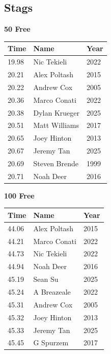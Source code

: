 \subsection{Stags}
\vspace{1.2em}
\noindent\begin{minipage}[t]{0.48\textwidth}
\centering
\textbf{\textcolor{teamprimary}{50 Free}}\par
\vspace{0.5em}
\centering
\small
\renewcommand{\arraystretch}{1.0}
\setlength{\tabcolsep}{4pt}
\begin{tabular}{@{}p{1.8cm}p{3.0cm}p{1.0cm}@{}}
\toprule
\textbf{Time} & \textbf{Name} & \textbf{Year} \\
\midrule
19.98 & Nic Tekieli & 2022 \\
20.21 & Alex Poltash & 2015 \\
20.22 & Andrew Cox & 2005 \\
20.36 & Marco Conati & 2022 \\
20.38 & Dylan Krueger & 2025 \\
20.51 & Matt Williams & 2017 \\
20.65 & Joey Hinton & 2013 \\
20.67 & Jeremy Tan & 2025 \\
20.69 & Steven Brende & 1999 \\
20.71 & Noah Deer & 2016 \\
\bottomrule
\end{tabular}
\end{minipage}
\hfill
\begin{minipage}[t]{0.48\textwidth}
\centering
\textbf{\textcolor{teamprimary}{100 Free}}\par
\vspace{0.5em}
\centering
\small
\renewcommand{\arraystretch}{1.0}
\setlength{\tabcolsep}{4pt}
\begin{tabular}{@{}p{1.8cm}p{3.0cm}p{1.0cm}@{}}
\toprule
\textbf{Time} & \textbf{Name} & \textbf{Year} \\
\midrule
44.06 & Alex Poltash & 2015 \\
44.21 & Marco Conati & 2022 \\
44.73 & Nic Tekieli & 2022 \\
44.94 & Noah Deer & 2016 \\
45.19 & Sean Su & 2025 \\
45.24 & A Breazeale & 2022 \\
45.31 & Andrew Cox & 2005 \\
45.32 & Joey Hinton & 2013 \\
45.33 & Jeremy Tan & 2025 \\
45.45 & G Spurzem & 2017 \\
\bottomrule
\end{tabular}
\end{minipage}
